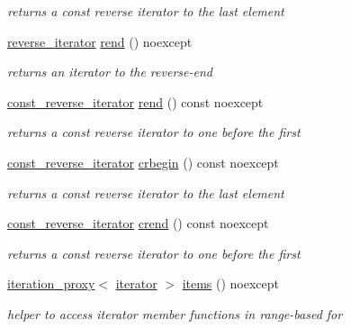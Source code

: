 \begin{DoxyCompactItemize}
\begin{DoxyCompactList}\small\item\em returns a const reverse iterator to the last element \end{DoxyCompactList}\item 
\mbox{\hyperlink{classnlohmann_1_1basic__json_ac223d5560c2b05a208c88de67376c5f2}{reverse\+\_\+iterator}} \mbox{\hyperlink{classnlohmann_1_1basic__json_ac77aed0925d447744676725ab0b6d535}{rend}} () noexcept
\begin{DoxyCompactList}\small\item\em returns an iterator to the reverse-\/end \end{DoxyCompactList}\item 
\mbox{\hyperlink{classnlohmann_1_1basic__json_a72be3c24bfa24f0993d6c11af03e7404}{const\+\_\+reverse\+\_\+iterator}} \mbox{\hyperlink{classnlohmann_1_1basic__json_a4f73d4cee67ea328d785979c22af0ae1}{rend}} () const noexcept
\begin{DoxyCompactList}\small\item\em returns a const reverse iterator to one before the first \end{DoxyCompactList}\item 
\mbox{\hyperlink{classnlohmann_1_1basic__json_a72be3c24bfa24f0993d6c11af03e7404}{const\+\_\+reverse\+\_\+iterator}} \mbox{\hyperlink{classnlohmann_1_1basic__json_a1e0769d22d54573f294da0e5c6abc9de}{crbegin}} () const noexcept
\begin{DoxyCompactList}\small\item\em returns a const reverse iterator to the last element \end{DoxyCompactList}\item 
\mbox{\hyperlink{classnlohmann_1_1basic__json_a72be3c24bfa24f0993d6c11af03e7404}{const\+\_\+reverse\+\_\+iterator}} \mbox{\hyperlink{classnlohmann_1_1basic__json_a5795b029dbf28e0cb2c7a439ec5d0a88}{crend}} () const noexcept
\begin{DoxyCompactList}\small\item\em returns a const reverse iterator to one before the first \end{DoxyCompactList}\item 
\mbox{\hyperlink{classnlohmann_1_1detail_1_1iteration__proxy}{iteration\+\_\+proxy}}$<$ \mbox{\hyperlink{classnlohmann_1_1basic__json_a099316232c76c034030a38faa6e34dca}{iterator}} $>$ \mbox{\hyperlink{classnlohmann_1_1basic__json_afe3e137ace692efa08590d8df40f58dd}{items}} () noexcept
\begin{DoxyCompactList}\small\item\em helper to access iterator member functions in range-\/based for \end{DoxyCompactList}\item 

\end{DoxyCompactItemize}
